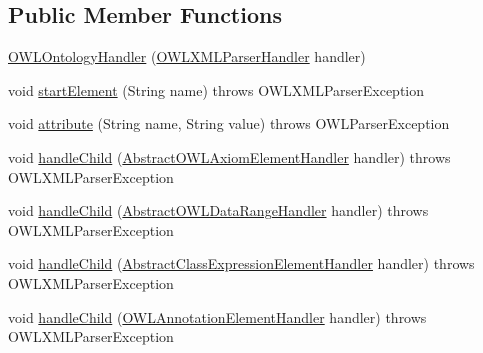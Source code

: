 \subsection*{Public Member Functions}
\begin{DoxyCompactItemize}
\item 
\hyperlink{classorg_1_1coode_1_1owlapi_1_1owlxmlparser_1_1_o_w_l_ontology_handler_a7d7d7fe6dce9f5a1882d7344ff076475}{O\-W\-L\-Ontology\-Handler} (\hyperlink{classorg_1_1coode_1_1owlapi_1_1owlxmlparser_1_1_o_w_l_x_m_l_parser_handler}{O\-W\-L\-X\-M\-L\-Parser\-Handler} handler)
\item 
void \hyperlink{classorg_1_1coode_1_1owlapi_1_1owlxmlparser_1_1_o_w_l_ontology_handler_ae0253e881f61dfd90f36ea6cffb01b72}{start\-Element} (String name)  throws O\-W\-L\-X\-M\-L\-Parser\-Exception 
\item 
void \hyperlink{classorg_1_1coode_1_1owlapi_1_1owlxmlparser_1_1_o_w_l_ontology_handler_a3fa5f20d9f8f9f0ef584c3a28ded38d9}{attribute} (String name, String value)  throws O\-W\-L\-Parser\-Exception 
\item 
void \hyperlink{classorg_1_1coode_1_1owlapi_1_1owlxmlparser_1_1_o_w_l_ontology_handler_a6f66ac951e5178a02f867326ccc32a9c}{handle\-Child} (\hyperlink{classorg_1_1coode_1_1owlapi_1_1owlxmlparser_1_1_abstract_o_w_l_axiom_element_handler}{Abstract\-O\-W\-L\-Axiom\-Element\-Handler} handler)  throws O\-W\-L\-X\-M\-L\-Parser\-Exception 
\item 
void \hyperlink{classorg_1_1coode_1_1owlapi_1_1owlxmlparser_1_1_o_w_l_ontology_handler_ad9794db091423dd8d310e846610998de}{handle\-Child} (\hyperlink{classorg_1_1coode_1_1owlapi_1_1owlxmlparser_1_1_abstract_o_w_l_data_range_handler}{Abstract\-O\-W\-L\-Data\-Range\-Handler} handler)  throws O\-W\-L\-X\-M\-L\-Parser\-Exception 
\item 
void \hyperlink{classorg_1_1coode_1_1owlapi_1_1owlxmlparser_1_1_o_w_l_ontology_handler_a13c7c67e5c69d6b8b9bdab522cb84a78}{handle\-Child} (\hyperlink{classorg_1_1coode_1_1owlapi_1_1owlxmlparser_1_1_abstract_class_expression_element_handler}{Abstract\-Class\-Expression\-Element\-Handler} handler)  throws O\-W\-L\-X\-M\-L\-Parser\-Exception 
\item 
void \hyperlink{classorg_1_1coode_1_1owlapi_1_1owlxmlparser_1_1_o_w_l_ontology_handler_aeaf6dbadbda96432c25aeb8898e1983e}{handle\-Child} (\hyperlink{classorg_1_1coode_1_1owlapi_1_1owlxmlparser_1_1_o_w_l_annotation_element_handler}{O\-W\-L\-Annotation\-Element\-Handler} handler)  throws O\-W\-L\-X\-M\-L\-Parser\-Exception 
\item 

\end{DoxyCompactItemize}
